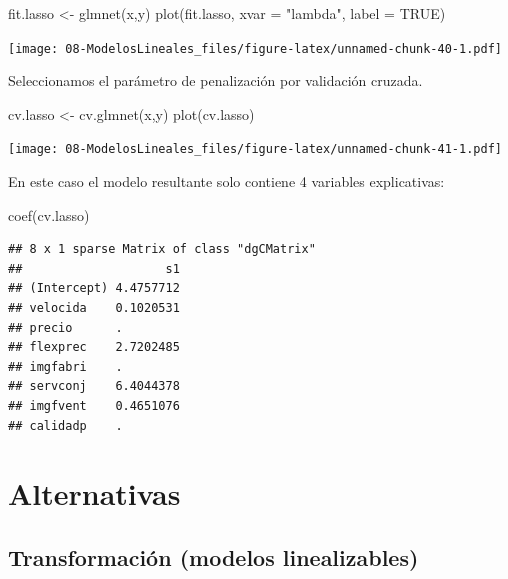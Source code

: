 \documentclass[
]{book}
\newenvironment{Shaded}{\begin{snugshade}}{\end{snugshade}}
\newcommand{\AttributeTok}[1]{\textcolor[rgb]{0.77,0.63,0.00}{#1}}
\newcommand{\ConstantTok}[1]{\textcolor[rgb]{0.00,0.00,0.00}{#1}}
\newcommand{\FunctionTok}[1]{\textcolor[rgb]{0.00,0.00,0.00}{#1}}
\newcommand{\NormalTok}[1]{#1}
\newcommand{\OtherTok}[1]{\textcolor[rgb]{0.56,0.35,0.01}{#1}}
\newcommand{\StringTok}[1]{\textcolor[rgb]{0.31,0.60,0.02}{#1}}
\theoremstyle{break}
\theoremstyle{nonumberplain}
\begin{document}
\begin{Shaded}
\begin{Highlighting}[]
\NormalTok{fit.lasso }\OtherTok{\textless{}{-}} \FunctionTok{glmnet}\NormalTok{(x,y)}
\FunctionTok{plot}\NormalTok{(fit.lasso, }\AttributeTok{xvar =} \StringTok{"lambda"}\NormalTok{, }\AttributeTok{label =} \ConstantTok{TRUE}\NormalTok{)}
\end{Highlighting}
\end{Shaded}

\texttt{[image: 08-ModelosLineales\_files/figure-latex/unnamed-chunk-40-1.pdf]}

Seleccionamos el parámetro de penalización por validación cruzada.

\begin{Shaded}
\begin{Highlighting}[]
\NormalTok{cv.lasso }\OtherTok{\textless{}{-}} \FunctionTok{cv.glmnet}\NormalTok{(x,y)}
\FunctionTok{plot}\NormalTok{(cv.lasso)}
\end{Highlighting}
\end{Shaded}

\texttt{[image: 08-ModelosLineales\_files/figure-latex/unnamed-chunk-41-1.pdf]}

En este caso el modelo resultante solo contiene 4 variables explicativas:

\begin{Shaded}
\begin{Highlighting}[]
\FunctionTok{coef}\NormalTok{(cv.lasso)}
\end{Highlighting}
\end{Shaded}

\begin{verbatim}
## 8 x 1 sparse Matrix of class "dgCMatrix"
##                    s1
## (Intercept) 4.4757712
## velocida    0.1020531
## precio      .        
## flexprec    2.7202485
## imgfabri    .        
## servconj    6.4044378
## imgfvent    0.4651076
## calidadp    .
\end{verbatim}

\hypertarget{alternativas}{%
\section{Alternativas}\label{alternativas}}

\hypertarget{transformaciuxf3n-modelos-linealizables}{%
\subsection{Transformación (modelos linealizables)}\label{transformaciuxf3n-modelos-linealizables}}
\end{document}
